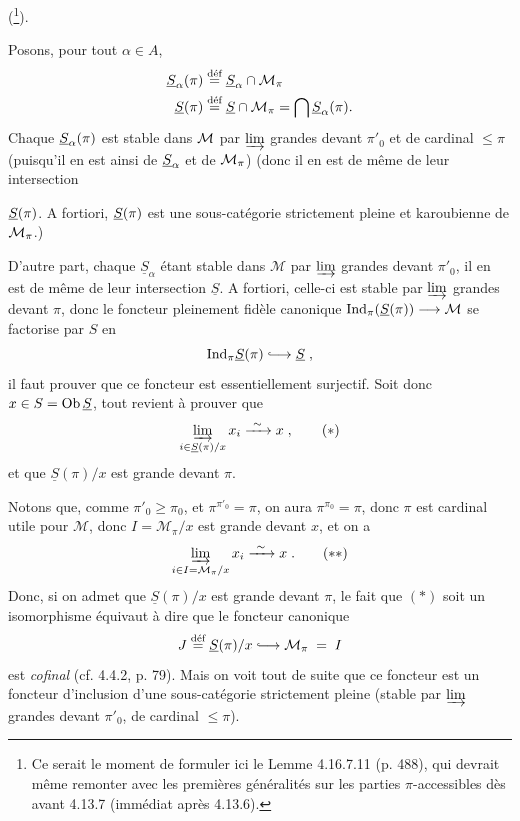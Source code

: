 (\footnote[124]{Ce serait le moment de formuler ici le Lemme 4.16.7.11 (p. 488), qui devrait même remonter avec les premières généralités sur les parties $\pi$-accessibles dès avant 4.13.7 (immédiat après 4.13.6).}).

Posons, pour tout $\alpha \in A$,
\[
\begin{aligned}
\underline{S}_\alpha(\pi) &\overset{\text{déf}}{=} \underline{S}_\alpha \cap \mathcal{M}_\pi \\
\underline{S}(\pi) &\overset{\text{déf}}{=} \underline{S} \cap \mathcal{M}_\pi = \bigcap \underline{S}_\alpha(\pi) .
\end{aligned}
\]
Chaque $\underline{S}_\alpha(\pi)$ est stable dans $\mathcal{M}$ par $\varinjlim$ grandes devant $\pi'_0$ et de cardinal $\leqslant \pi$ (puisqu'il en est ainsi de $\underline{S}_\alpha$ et de $\mathcal{M}_\pi$) (donc il en est de même de leur intersection

$\underline{S}(\pi)$. A fortiori, $\underline{S}(\pi)$ est une sous-catégorie strictement pleine et karoubienne de $\mathcal{M}_\pi$.)


D'autre part, chaque $\underline{S}_\alpha$ étant stable dans $\mathcal{M}$ par $\varinjlim$ grandes devant $\pi'_0$, il en est de même de leur intersection $\underline{S}$. A fortiori, celle-ci est stable par $\varinjlim$ grandes devant $\pi$, donc le foncteur pleinement fidèle canonique $\mathrm{Ind}_\pi(\underline{S}(\pi))\longrightarrow\mathcal{M}$ se factorise par $S$ en
\[ \Ind_\pi\underline{S}(\pi) \incl \underline{S} \; , \]
il faut prouver que ce foncteur est essentiellement surjectif. Soit donc $x\in S=\operatorname{Ob}\underline{S}$, tout revient à prouver que
\[ \varinjlim_{i\in\underline{S}(\pi)/x} x_i \xrightarrow{\ \sim\ } x \; , \tag*{$(*)$} \]
et que $\underline{S}(\pi)/x$ est grande devant $\pi$.

Notons que, comme $\pi'_0\geqslant\pi_0$, et $\pi^{\pi'_0}=\pi$, on aura $\pi^{\pi_0}=\pi$, donc $\pi$ est cardinal utile pour $\mathcal{M}$, donc $I=\mathcal{M}_\pi/x$ est grande devant $x$, et on a %
\[ \varinjlim_{i\in I=\mathcal{M}_\pi/x} x_i \xrightarrow{\ \sim\ } x \; . \tag*{$(**)$} \]
Donc, si on admet que $\underline{S}(\pi)/x$ est grande devant $\pi$,
le fait que $(*)$ soit un isomorphisme équivaut à dire que le foncteur canonique
\[ J \overset{\text{déf}}{=} \underline{S}(\pi)/x \incl \mathcal{M}_\pi \; = \; I \] %
est \textit{cofinal} (cf. 4.4.2, p. 79). Mais on voit tout de suite que ce foncteur est un foncteur d'inclusion d'une sous-catégorie strictement pleine (stable par $\varinjlim$ grandes devant $\pi'_0$, de cardinal $\leqslant\pi$).

